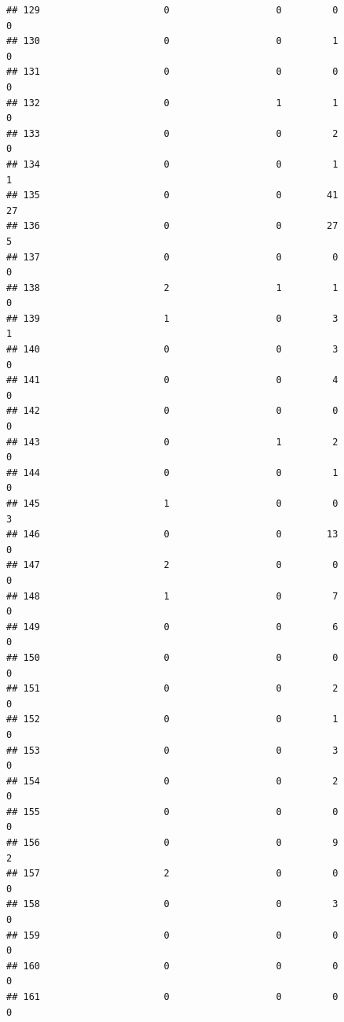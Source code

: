 \documentclass[
]{article}
\begin{document}
\begin{verbatim}
## 129                      0                   0         0                  0
## 130                      0                   0         1                  0
## 131                      0                   0         0                  0
## 132                      0                   1         1                  0
## 133                      0                   0         2                  0
## 134                      0                   0         1                  1
## 135                      0                   0        41                 27
## 136                      0                   0        27                  5
## 137                      0                   0         0                  0
## 138                      2                   1         1                  0
## 139                      1                   0         3                  1
## 140                      0                   0         3                  0
## 141                      0                   0         4                  0
## 142                      0                   0         0                  0
## 143                      0                   1         2                  0
## 144                      0                   0         1                  0
## 145                      1                   0         0                  3
## 146                      0                   0        13                  0
## 147                      2                   0         0                  0
## 148                      1                   0         7                  0
## 149                      0                   0         6                  0
## 150                      0                   0         0                  0
## 151                      0                   0         2                  0
## 152                      0                   0         1                  0
## 153                      0                   0         3                  0
## 154                      0                   0         2                  0
## 155                      0                   0         0                  0
## 156                      0                   0         9                  2
## 157                      2                   0         0                  0
## 158                      0                   0         3                  0
## 159                      0                   0         0                  0
## 160                      0                   0         0                  0
## 161                      0                   0         0                  0

\end{verbatim}
\end{document}
